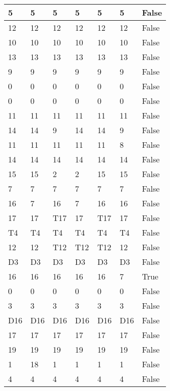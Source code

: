\begin{longtable}[htbp]{| p{} | p{} | p{}| p{}| p{}| p{}| p{}|}
5 & 5 & 5 & 5 & 5 & 5 & False \\ \hline
12 & 12 & 12 & 12 & 12 & 12 & False \\ \hline
10 & 10 & 10 & 10 & 10 & 10 & False \\ \hline
13 & 13 & 13 & 13 & 13 & 13 & False \\ \hline
9 & 9 & 9 & 9 & 9 & 9 & False \\ \hline
0 & 0 & 0 & 0 & 0 & 0 & False \\ \hline
0 & 0 & 0 & 0 & 0 & 0 & False \\ \hline
11 & 11 & 11 & 11 & 11 & 11 & False \\ \hline
14 & 14 & 9 & 14 & 14 & 9 & False \\ \hline
11 & 11 & 11 & 11 & 11 & 8 & False \\ \hline
14 & 14 & 14 & 14 & 14 & 14 & False \\ \hline
15 & 15 & 2 & 2 & 15 & 15 & False \\ \hline
7 & 7 & 7 & 7 & 7 & 7 & False \\ \hline
16 & 7 & 16 & 7 & 16 & 16 & False \\ \hline
17 & 17 & \multicolumn{1}{l|}{T17} & 17 & \multicolumn{1}{l|}{T17} & 17 & False \\ \hline
\multicolumn{1}{|l|}{T4} & \multicolumn{1}{l|}{T4} & \multicolumn{1}{l|}{T4} & \multicolumn{1}{l|}{T4} & \multicolumn{1}{l|}{T4} & \multicolumn{1}{l|}{T4} & False \\ \hline
12 & 12 & \multicolumn{1}{l|}{T12} & \multicolumn{1}{l|}{T12} & \multicolumn{1}{l|}{T12} & 12 & False \\ \hline
\multicolumn{1}{|l|}{D3} & \multicolumn{1}{l|}{D3} & \multicolumn{1}{l|}{D3} & \multicolumn{1}{l|}{D3} & \multicolumn{1}{l|}{D3} & \multicolumn{1}{l|}{D3} & False \\ \hline
16 & 16 & 16 & 16 & 16 & 7 & True \\ \hline
0 & 0 & 0 & 0 & 0 & 0 & False \\ \hline
3 & 3 & 3 & 3 & 3 & 3 & False \\ \hline
\multicolumn{1}{|l|}{D16} & \multicolumn{1}{l|}{D16} & \multicolumn{1}{l|}{D16} & \multicolumn{1}{l|}{D16} & \multicolumn{1}{l|}{D16} & \multicolumn{1}{l|}{D16} & False \\ \hline
17 & 17 & 17 & 17 & 17 & 17 & False \\ \hline
19 & 19 & 19 & 19 & 19 & 19 & False \\ \hline
1 & 18 & 1 & 1 & 1 & 1 & False \\ \hline
4 & 4 & 4 & 4 & 4 & 4 & False \\ \hline

\end{longtable}
